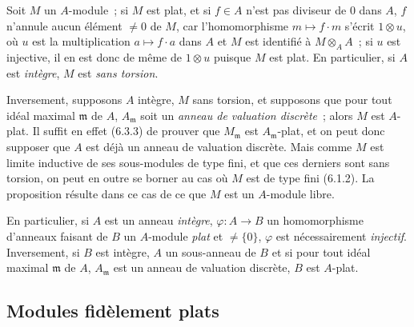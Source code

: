 \begin{env}[6.3.4]
\label{0.6.3.4-fr}
Soit $M$ un $A$-module~; si $M$ est plat, et si $f\in A$ n'est pas diviseur
de $0$ dans $A$, $f$ n'annule aucun élément $\neq0$ de $M$, car
l'homomorphisme $m\mapsto f\cdot m$ s'écrit $1\otimes u$, où $u$ est la
multiplication $a\mapsto f\cdot a$ dans $A$ et $M$ est identifié à
$M\otimes_A A$~; si $u$ est injective, il en est donc de même de
$1\otimes u$ puisque $M$ est plat. En particulier, si $A$ est
\emph{intègre}, $M$ est \emph{sans torsion}.

Inversement, supposons $A$ intègre, $M$ sans torsion, et supposons que pour
tout idéal maximal $\mathfrak{m}$ de $A$, $A_\mathfrak{m}$ soit un
\emph{anneau de valuation discrète}~; alors $M$ est $A$-plat. Il suffit en
effet (6.3.3) de prouver que $M_\mathfrak{m}$ est $A_\mathfrak{m}$-plat, et
on peut donc supposer que $A$ est déjà un anneau de valuation discrète. Mais
comme $M$ est limite inductive de ses sous-modules de type fini, et que ces
derniers sont sans torsion, on peut en outre se borner au cas où $M$ est de
type fini (6.1.2). La proposition résulte dans ce cas de ce que $M$ est un
$A$-module libre.

En particulier, si $A$ est un anneau \emph{intègre},
$\varphi:A\to B$ un homomorphisme d'anneaux faisant de $B$ un $A$-module
\emph{plat} et $\neq\{0\}$, $\varphi$ est nécessairement \emph{injectif}.
Inversement, si $B$ est intègre, $A$ un sous-anneau de $B$ et si pour tout
idéal maximal $\mathfrak{m}$ de $A$, $A_\mathfrak{m}$ est un anneau de
valuation discrète, $B$ est $A$-plat.
\end{env}

\subsection{Modules fidèlement plats}
\label{subsection:0.6.4-fr}

